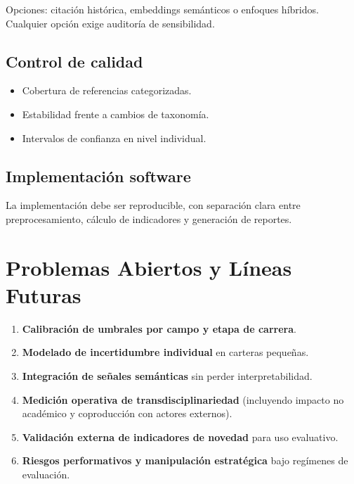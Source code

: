 \documentclass[
]{article}
\providecommand{\tightlist}{%
  \setlength{\itemsep}{0pt}\setlength{\parskip}{0pt}}
\begin{document}
Opciones: citación histórica, embeddings semánticos o enfoques híbridos.
Cualquier opción exige auditoría de sensibilidad.

\hypertarget{control-de-calidad}{%
\subsection{Control de calidad}\label{control-de-calidad}}

\begin{itemize}
\tightlist
\item
  Cobertura de referencias categorizadas.
\item
  Estabilidad frente a cambios de taxonomía.
\item
  Intervalos de confianza en nivel individual.
\end{itemize}

\hypertarget{implementaciuxf3n-software}{%
\subsection{Implementación software}\label{implementaciuxf3n-software}}

La implementación debe ser reproducible, con separación clara entre
preprocesamiento, cálculo de indicadores y generación de reportes.

\hypertarget{problemas-abiertos-y-luxedneas-futuras}{%
\section{Problemas Abiertos y Líneas
Futuras}\label{problemas-abiertos-y-luxedneas-futuras}}

\begin{enumerate}
\def\labelenumi{\arabic{enumi}.}
\tightlist
\item
  \textbf{Calibración de umbrales por campo y etapa de carrera}.
\item
  \textbf{Modelado de incertidumbre individual} en carteras pequeñas.
\item
  \textbf{Integración de señales semánticas} sin perder
  interpretabilidad.
\item
  \textbf{Medición operativa de transdisciplinariedad} (incluyendo
  impacto no académico y coproducción con actores externos).
\item
  \textbf{Validación externa de indicadores de novedad} para uso
  evaluativo.
\item
  \textbf{Riesgos performativos y manipulación estratégica} bajo
  regímenes de evaluación.
\end{enumerate}
\end{document}
